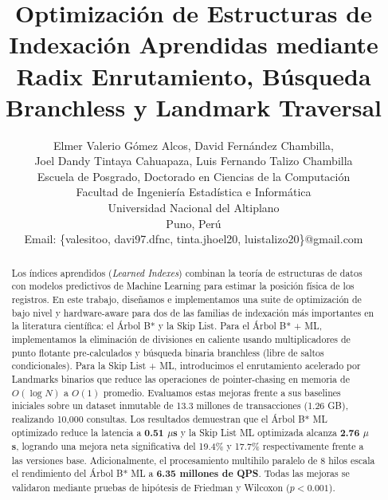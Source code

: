\documentclass[twocolumn,10pt,journal]{IEEEtran}
\begin{document}
\title{Optimizaci\'on de Estructuras de Indexaci\'on Aprendidas mediante Radix Enrutamiento, B\'usqueda Branchless y Landmark Traversal}

\author{
    Elmer Valerio G\'omez Alcos, David Fern\'andez Chambilla,\\
    Joel Dandy Tintaya Cahuapaza, Luis Fernando Talizo Chambilla\\
    \small{Escuela de Posgrado, Doctorado en Ciencias de la Computaci\'on}\\
    \small{Facultad de Ingenier\'ia Estad\'istica e Inform\'atica}\\
    \small{Universidad Nacional del Altiplano}\\
    \small{Puno, Per\'u}\\
    \small{Email: \{valesitoo, davi97.dfnc, tinta.jhoel20, luistalizo20\}@gmail.com}
}

\maketitle

\begin{abstract}
Los \'indices aprendidos (\textit{Learned Indexes}) combinan la teor\'ia de estructuras de datos con modelos predictivos de Machine Learning para estimar la posici\'on f\'isica de los registros. En este trabajo, diseñamos e implementamos una suite de optimizaci\'on de bajo nivel y hardware-aware para dos de las familias de indexaci\'on m\'as importantes en la literatura cient\'ifica: el \'Arbol B* y la Skip List. Para el \'Arbol B* + ML, implementamos la eliminaci\'on de divisiones en caliente usando multiplicadores de punto flotante pre-calculados y b\'usqueda binaria branchless (libre de saltos condicionales). Para la Skip List + ML, introducimos el enrutamiento acelerado por Landmarks binarios que reduce las operaciones de pointer-chasing en memoria de $O(\log N)$ a $O(1)$ promedio. Evaluamos estas mejoras frente a sus baselines iniciales sobre un dataset inmutable de 13.3 millones de transacciones (1.26 GB), realizando 10,000 consultas. Los resultados demuestran que el \'Arbol B* ML optimizado reduce la latencia a \textbf{0.51 $\mu$s} y la Skip List ML optimizada alcanza \textbf{2.76 $\mu$s}, logrando una mejora neta significativa del 19.4\% y 17.7\% respectivamente frente a las versiones base. Adicionalmente, el procesamiento multihilo paralelo de 8 hilos escala el rendimiento del \'Arbol B* ML a \textbf{6.35 millones de QPS}. Todas las mejoras se validaron mediante pruebas de hip\'otesis de Friedman y Wilcoxon ($p < 0.001$).
\end{abstract}
\end{document}
